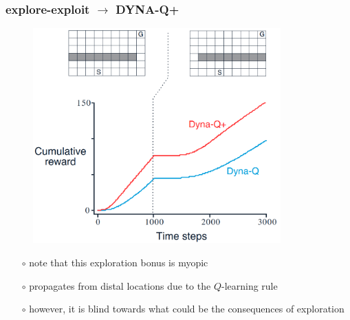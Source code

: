 \documentclass[aspectratio=169]{beamer}
\begin{document}
\begin{frame}
    \frametitle{explore-exploit $\rightarrow$ DYNA-Q+} 
    \begin{minipage}{0.6\textwidth}
        \begin{figure}
            \centering
            \includegraphics[width=0.85\textwidth]{dynaqplus.png}
        \end{figure}
    \end{minipage}%
    \begin{minipage}{0.4\textwidth}
        \begin{itemize}
            \item[$\circ$] note that this exploration bonus is myopic
            \item[$\circ$] propagates from distal locations due to the $Q$-learning rule 
            \item[$\circ$] however, it is blind towards what could be the consequences of exploration 
        \end{itemize}
    \end{minipage}
\end{frame}
\end{document}
